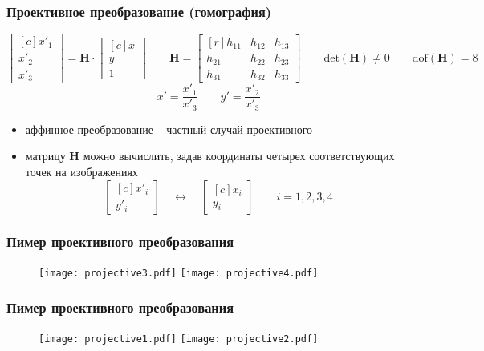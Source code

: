 \documentclass[
    12pt, 
    usepdftitle=false,
    aspectratio=1610
]{beamer}
\begin{document}
\begin{frame}
\frametitle{Проективное преобразование (гомография)}
$$
    \begin{bmatrix*}[c]
        x'_1 \\ x'_2 \\ x'_3    
    \end{bmatrix*}=
    \mathbf{H}\cdot
    \begin{bmatrix*}[c]
        x \\ y \\ 1    
    \end{bmatrix*}\qquad
    \mathbf{H}=
    \begin{bmatrix*}[r]
        h_{11} & h_{12} & h_{13} \\
        h_{21} & h_{22} & h_{23} \\
        h_{31} & h_{32} & h_{33}
    \end{bmatrix*}
     \qquad
    \mathrm{det}(\mathbf{H})\ne0
    \qquad
    \mathrm{dof}(\mathbf{H})=8
$$
$$
    x'=\frac{x'_1}{x'_3}\qquad y'=\frac{x'_2}{x'_3}
$$
\begin{itemize}
    \item аффинное преобразование -- частный случай проективного
    \item матрицу $\mathbf{H}$ можно вычислить, задав координаты четырех соответствующих точек 
          на изображениях
    $$
        \begin{bmatrix*}[c]
            x'_i \\ y'_i 
        \end{bmatrix*}
        \quad\leftrightarrow\quad
        \begin{bmatrix*}[c]
            x_i \\ y_i   
        \end{bmatrix*}\qquad
        i=1,2,3,4
    $$
\end{itemize}
\end{frame}

\begin{frame}
\frametitle{Пимер проективного преобразования}
\begin{figure}[t]
    \texttt{[image: projective3.pdf]}
    \texttt{[image: projective4.pdf]}
\end{figure}
\end{frame}

\begin{frame}
\frametitle{Пимер проективного преобразования}
\begin{figure}[t]
    \texttt{[image: projective1.pdf]}
    \texttt{[image: projective2.pdf]}
\end{figure}
\end{frame}
\end{document}
